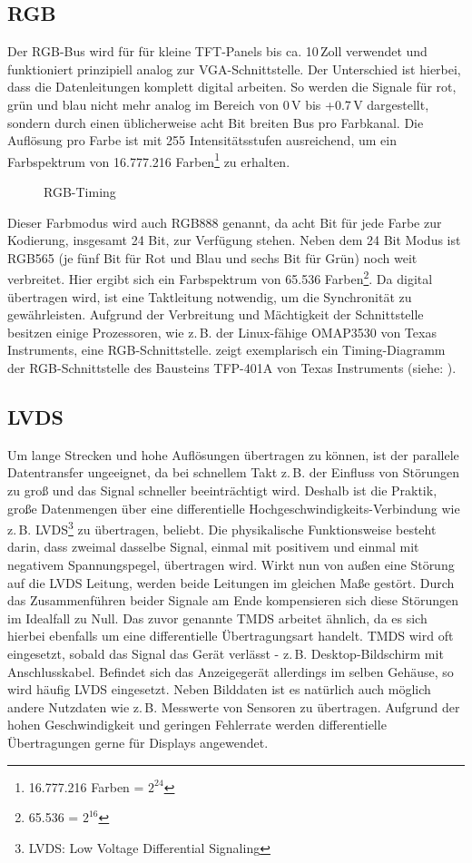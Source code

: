 \subsection{RGB}
Der RGB-Bus wird für für kleine TFT-Panels bis ca. 10\,Zoll verwendet und funktioniert prinzipiell analog zur VGA-Schnittstelle. Der Unterschied ist hierbei, dass die Datenleitungen komplett digital arbeiten. So werden die Signale für rot, grün und blau nicht mehr analog im Bereich von 0\,V bis +0.7\,V dargestellt, sondern durch einen üblicherweise acht Bit breiten Bus pro Farbkanal. Die Auflösung pro Farbe ist mit 255 Intensitätsstufen ausreichend, um ein Farbspektrum von 16.777.216 Farben\footnote{16.777.216 Farben = $2^{24}$} zu erhalten. 
\begin{figure}[htp]
	\centering
{}
	\caption{RGB-Timing}
	\label{fig:rgb_timing}
\end{figure}
Dieser Farbmodus wird auch RGB888 genannt, da acht Bit für jede Farbe zur Kodierung, insgesamt 24 Bit, zur Verfügung stehen. Neben dem 24 Bit Modus ist RGB565 (je fünf Bit für Rot und Blau und sechs Bit für Grün) noch weit verbreitet. Hier ergibt sich ein Farbspektrum von 65.536 Farben\footnote{65.536 = $2^{16}$}. Da digital übertragen wird, ist eine Taktleitung notwendig, um die Synchronität zu gewährleisten. 
Aufgrund der Verbreitung und Mächtigkeit der Schnittstelle besitzen einige Prozessoren, wie z.\,B. der Linux-fähige OMAP3530 von Texas Instruments, eine RGB-Schnittstelle. 
 zeigt exemplarisch ein Timing-Diagramm der RGB-Schnittstelle des Bausteins TFP-401A von Texas Instruments (siehe: \cite{TI2011}).
\subsection{LVDS}
Um lange Strecken und hohe Auflösungen übertragen zu können, ist der parallele Datentransfer ungeeignet, da bei schnellem Takt z.\,B. der Einfluss von Störungen zu groß und das Signal schneller beeinträchtigt wird. Deshalb ist die Praktik, große Datenmengen über eine differentielle Hochgeschwindigkeits-Verbindung wie z.\,B. LVDS\footnote{LVDS: Low Voltage Differential Signaling} zu übertragen, beliebt. Die physikalische Funktionsweise besteht darin, dass zweimal dasselbe Signal, einmal mit positivem und einmal mit negativem Spannungspegel, übertragen wird. Wirkt nun von außen eine Störung auf die LVDS Leitung, werden beide Leitungen im gleichen Maße gestört. Durch das Zusammenführen beider Signale am Ende kompensieren sich diese Störungen im Idealfall zu Null. Das zuvor genannte TMDS arbeitet ähnlich, da es sich hierbei ebenfalls um eine differentielle Übertragungsart handelt. TMDS wird oft eingesetzt, sobald das Signal das Gerät verlässt - z.\,B. Desktop-Bildschirm mit Anschlusskabel. Befindet sich das Anzeigegerät allerdings im selben Gehäuse, so wird häufig LVDS eingesetzt. Neben Bilddaten ist es natürlich auch möglich andere Nutzdaten wie z.\,B. Messwerte von Sensoren zu übertragen. 
Aufgrund der hohen Geschwindigkeit und geringen Fehlerrate werden differentielle Übertragungen gerne für Displays angewendet.
